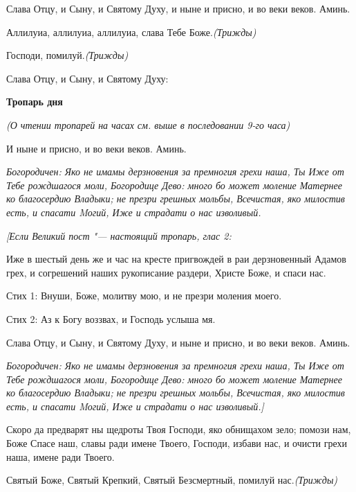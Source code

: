 Слава Отцу, и Сыну, и Святому Духу, и ныне и присно, и во веки веков. Аминь.


Аллилуиа, аллилуиа, аллилуиа, слава Тебе Боже.\itshape  (Трижды)\normalfont{}


Господи, помилуй.\itshape  (Трижды)\normalfont{}


Слава Отцу, и Сыну, и Святому Духу:


\medskip
\bfseries Тропарь дня\normalfont{}


\itshape (О чтении тропарей на часах см. выше в последовании 9-го часа)

\normalfont{}И ныне и присно, и во веки веков. Аминь.

\itshape Богородиче\normalfont{}н: Яко не имамы дерзновения за премногия грехи наша, Ты Иже от Тебе рождшагося моли, Богородице Дево: много бо может моление Матернее ко благосердию Владыки; не презри грешных мольбы, Всечистая, яко милостив есть, и спасати Mогий, Иже и страдати о нас изволивый.



\itshape [Если Великий пост "--- настоящий тропарь, глас 2:\normalfont{}

Иже в шестый день же и час на кресте пригвождей в раи дерзновенный Адамов грех, и согрешений наших рукописание раздери, Христе Боже, и спаси нас.




Стих 1: Внуши, Боже, молитву мою, и не презри моления моего.




Стих 2: Аз к Богу воззвах, и Господь услыша мя.



Слава Отцу, и Сыну, и Святому Духу, и ныне и присно, и во веки веков. Аминь.

\itshape Богородиче\normalfont{}н: Яко не имамы дерзновения за премногия грехи наша, Ты Иже от Тебе рождшагося моли, Богородице Дево: много бо может моление Матернее ко благосердию Владыки; не презри грешных мольбы, Всечистая, яко милостив есть, и спасати Mогий, Иже и страдати о нас изволивый.]





Скоро да предварят ны щедроты Твоя Господи, яко обнищахом зело; помози нам, Боже Спасе наш, славы ради имене Твоего, Господи, избави нас, и очисти грехи наша, имене ради Твоего.



Святый Боже, Святый Крепкий, Святый Безсмертный, помилуй нас.\itshape  (Трижды)

